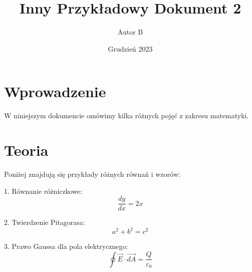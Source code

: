 \documentclass{article}
\title{Inny Przykładowy Dokument 2}
\author{Autor B}
\date{Grudzień 2023}
\begin{document}
\maketitle

\section{Wprowadzenie}

W niniejszym dokumencie omówimy kilka różnych pojęć z zakresu matematyki.

\section{Teoria}

Poniżej znajdują się przykłady różnych równań i wzorów:

1. Równanie różniczkowe:
\[ \frac{dy}{dx} = 2x \]

2. Twierdzenie Pitagorasa:
\[ a^2 + b^2 = c^2 \]

3. Prawo Gaussa dla pola elektrycznego:
\[ \oint \vec{E} \cdot \vec{dA} = \frac{Q}{\varepsilon_0} \]
\end{document}
